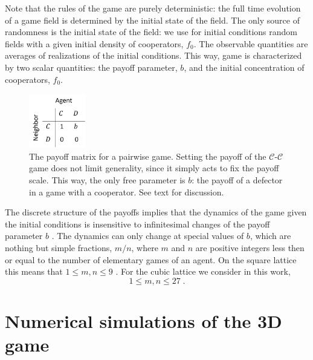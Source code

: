 \documentclass[a4paper]{jpconf}
\begin{document}
Note that the rules of the game are purely deterministic: the full time
evolution of a game field is determined by the initial state of the field. 
The only source of randomness is the initial state of the field: we use for initial
conditions random fields with a given initial density of cooperators, $f_0$.
The observable quantities are averages of realizations of the initial conditions.
This way, game is characterized by two scalar quantities: the payoff parameter, $b$,
and the initial concentration of cooperators, $f_0$.

\begin{figure}[htb]
\begin{center}
\includegraphics[width=0.22\textwidth]{Game_score_table.png}
\caption{The payoff matrix for a pairwise game. Setting the payoff of the
$\mathcal{C}$-$\mathcal{C}$ game does not limit generality, since it simply acts
to fix the payoff scale. This way, the only free parameter is $b$: the payoff of
a defector in a game with a cooperator. 
See text for discussion.}	
\label{fig:score-table}	
\end{center}
\end{figure}


The discrete structure of the payoffs implies that the dynamics of the game given
the initial conditions is insensitive to infinitesimal changes of the payoff parameter $b$ \cite{Nowak1992}.
The dynamics can only change at special values of $b$, which are nothing but simple fractions, $m/n$, 
where $m$ and $n$ are positive integers less then or equal to the number of elementary games of an agent.
On the square lattice this means that $1 \leqslant m, n \leqslant 9$ \cite{Nowak1992}. For the cubic lattice we consider in this work, 
%
\begin{equation}
1 \leqslant m, n \leqslant 27\;.
\label{mn}
\end{equation}


\section{Numerical simulations of the 3D game}
\label{sec:3D}
\end{document}
